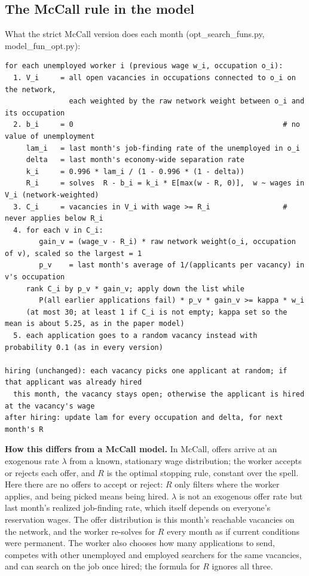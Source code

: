\documentclass[10pt]{article}
\begin{document}
\subsection*{The McCall rule in the model}
What the strict McCall version does each month (opt\_search\_funs.py, model\_fun\_opt.py):

\begin{footnotesize}
\begin{verbatim}
for each unemployed worker i (previous wage w_i, occupation o_i):
  1. V_i     = all open vacancies in occupations connected to o_i on the network,
               each weighted by the raw network weight between o_i and its occupation
  2. b_i     = 0                                                 # no value of unemployment
     lam_i   = last month's job-finding rate of the unemployed in o_i
     delta   = last month's economy-wide separation rate
     k_i     = 0.996 * lam_i / (1 - 0.996 * (1 - delta))
     R_i     = solves  R - b_i = k_i * E[max(w - R, 0)],  w ~ wages in V_i (network-weighted)
  3. C_i     = vacancies in V_i with wage >= R_i                 # never applies below R_i
  4. for each v in C_i:
        gain_v = (wage_v - R_i) * raw network weight(o_i, occupation of v), scaled so the largest = 1
        p_v    = last month's average of 1/(applicants per vacancy) in v's occupation
     rank C_i by p_v * gain_v; apply down the list while
        P(all earlier applications fail) * p_v * gain_v >= kappa * w_i
     (at most 30; at least 1 if C_i is not empty; kappa set so the mean is about 5.25, as in the paper model)
  5. each application goes to a random vacancy instead with probability 0.1 (as in every version)

hiring (unchanged): each vacancy picks one applicant at random; if that applicant was already hired
  this month, the vacancy stays open; otherwise the applicant is hired at the vacancy's wage
after hiring: update lam for every occupation and delta, for next month's R
\end{verbatim}
\end{footnotesize}

\textbf{How this differs from a McCall model.} In McCall, offers arrive at an exogenous rate $\lambda$ from a
known, stationary wage distribution; the worker accepts or rejects each offer, and $R$ is the optimal
stopping rule, constant over the spell. Here there are no offers to accept or reject: $R$ only filters where
the worker applies, and being picked means being hired. $\lambda$ is not an exogenous offer rate but last
month's realized job-finding rate, which itself depends on everyone's reservation wages. The offer
distribution is this month's reachable vacancies on the network, and the worker re-solves for $R$ every month
as if current conditions were permanent. The worker also chooses how many applications to send, competes
with other unemployed and employed searchers for the same vacancies, and can search on the job once hired;
the formula for $R$ ignores all three.
\end{document}
